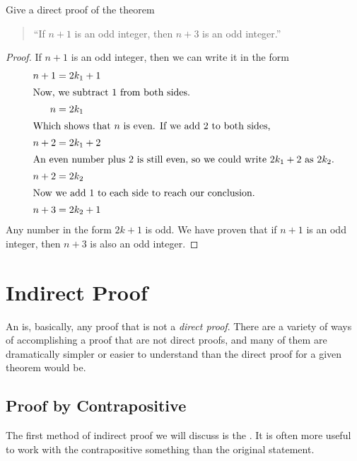 \begin{ex}
  Give a direct proof of the theorem
  \begin{quote} ``If $n+1$ is an odd integer, then $n+3$ is an odd integer.''
  \end{quote}
  \begin{proof}
    If $n+1$ is an odd integer, then we can write it in the form
    \begin{align*}
      n+1 &= 2k_1+1 \\
      \intertext{Now, we subtract $1$ from both sides.}
      n &= 2k_1 \\ \intertext{Which shows that $n$ is even. If we add $2$ to both sides,}
      n+2 &= 2k_1 +2 \\
      \intertext{An even number plus $2$ is still even, so we could write $2k_1+2$ as $2k_2$.}
      n+2 &= 2k_2 \\
      \intertext{Now we add $1$ to each side to reach our conclusion.}
      n+3 &= 2k_2 + 1
    \end{align*}
    Any number in the form $2k+1$ is odd.
    We have proven that if $n+1$ is an odd integer, then $n+3$ is also an odd integer.
  \end{proof}
\end{ex}

\section{Indirect Proof}

An  is, basically, any proof that is not a \emph{direct proof}.
There are a variety of ways of accomplishing a proof that are not direct proofs,
and many of them are dramatically simpler or easier to understand than the direct
proof for a given theorem would be.

\subsection{Proof by Contrapositive}\label{sec:contrapositive}
The first method of indirect proof we will discuss is the .
It is often more useful to work with the contrapositive something than the original statement.

